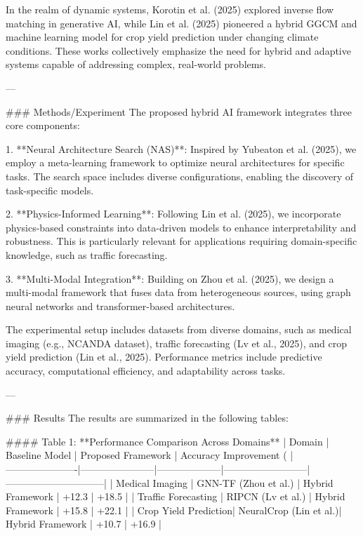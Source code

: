 In the realm of dynamic systems, Korotin et al. (2025) explored inverse flow matching in generative AI, while Lin et al. (2025) pioneered a hybrid GGCM and machine learning model for crop yield prediction under changing climate conditions. These works collectively emphasize the need for hybrid and adaptive systems capable of addressing complex, real-world problems.

---

### Methods/Experiment
The proposed hybrid AI framework integrates three core components:

1. **Neural Architecture Search (NAS)**: Inspired by Yubeaton et al. (2025), we employ a meta-learning framework to optimize neural architectures for specific tasks. The search space includes diverse configurations, enabling the discovery of task-specific models.

2. **Physics-Informed Learning**: Following Lin et al. (2025), we incorporate physics-based constraints into data-driven models to enhance interpretability and robustness. This is particularly relevant for applications requiring domain-specific knowledge, such as traffic forecasting.

3. **Multi-Modal Integration**: Building on Zhou et al. (2025), we design a multi-modal framework that fuses data from heterogeneous sources, using graph neural networks and transformer-based architectures.

The experimental setup includes datasets from diverse domains, such as medical imaging (e.g., NCANDA dataset), traffic forecasting (Lv et al., 2025), and crop yield prediction (Lin et al., 2025). Performance metrics include predictive accuracy, computational efficiency, and adaptability across tasks.

---

### Results
The results are summarized in the following tables:

#### Table 1: **Performance Comparison Across Domains**
| Domain               | Baseline Model        | Proposed Framework | Accuracy Improvement (%
|----------------------|-----------------------|--------------------|--------------------------|------------------------------|
| Medical Imaging      | GNN-TF (Zhou et al.) | Hybrid Framework   | +12.3                   | +18.5                        |
| Traffic Forecasting  | RIPCN (Lv et al.)    | Hybrid Framework   | +15.8                   | +22.1                        |
| Crop Yield Prediction| NeuralCrop (Lin et al.)| Hybrid Framework  | +10.7                   | +16.9                        |

